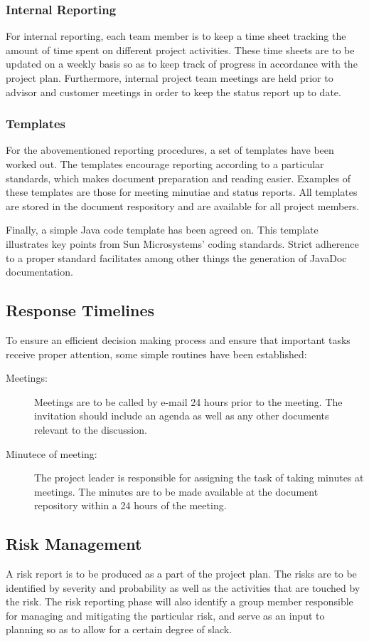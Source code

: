 \subsubsection{Internal Reporting}
For internal reporting, each team member is to keep a time sheet tracking the amount of time spent on different project activities. These time sheets are to be updated on a weekly basis so as to keep track of progress in accordance with the project plan. Furthermore, internal project team meetings are held prior to advisor and customer meetings in order to keep the status report up to date.

\subsubsection{Templates}
For the abovementioned reporting procedures, a set of templates have been worked out. The templates encourage reporting according to a particular standards, which makes document preparation and reading easier. Examples of these templates are those for meeting minutiae and status reports. All templates are stored in the document respository and are available for all project members.

Finally, a simple Java code template has been agreed on. This template illustrates key points from Sun Microsystems' coding standards. Strict adherence to a proper standard facilitates among other things the generation of JavaDoc documentation.

\subsection{Response Timelines}
To ensure an efficient decision making process and ensure that important tasks receive proper attention, some simple routines have been established:
\begin{description}
\item[Meetings:] Meetings are to be called by e-mail 24 hours prior to the meeting. The invitation should include an agenda as well as any other documents relevant to the discussion.
\item[Minutece of meeting:] The project leader is responsible for assigning the task of taking minutes at meetings. The minutes are to be made available at the document repository within a 24 hours of the meeting.
\end{description}

\subsection{Risk Management}
A risk report is to be produced as a part of the project plan. The risks are to be identified by severity and probability as well as the activities that are touched by the risk. The risk reporting phase will also identify a group member responsible for managing and mitigating the particular risk, and serve as an input to planning so as to allow for a certain degree of slack.

